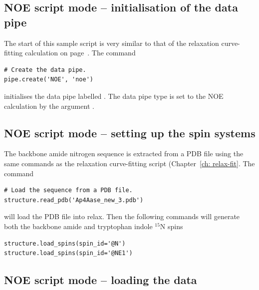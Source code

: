 
\subsection{NOE script mode -- initialisation of the data pipe} \label{NOE initialisation}

The start of this sample script is very similar to that of the relaxation curve-fitting calculation on page~\pageref{Rx initialisation}.
The command

\begin{lstlisting}[firstnumber=3]
# Create the data pipe.
pipe.create('NOE', 'noe')
\end{lstlisting}

initialises the data pipe labelled .
The data pipe type is set to the NOE calculation by the argument .



\subsection{NOE script mode -- setting up the spin systems}

The backbone amide nitrogen sequence is extracted from a PDB file using the same commands as the relaxation curve-fitting script (Chapter~\ref{ch: relax-fit}.
The command

\begin{lstlisting}[firstnumber=6]
# Load the sequence from a PDB file.
structure.read_pdb('Ap4Aase_new_3.pdb')
\end{lstlisting}

will load the PDB file  into relax.
Then the following commands will generate both the backbone amide and tryptophan indole $^{15}$N spins

\begin{lstlisting}[firstnumber=8]
structure.load_spins(spin_id='@N')
structure.load_spins(spin_id='@NE1')
\end{lstlisting}



\subsection{NOE script mode -- loading the data}

